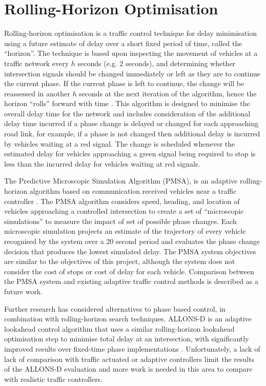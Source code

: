 \section{Rolling-Horizon Optimisation}
\label{bg:rolling-horizon}

Rolling-horizon optimisation is a traffic control technique for delay minimisation using a future estimate of delay over a short fixed period of time, called the ``horizon''. The technique is based upon inspecting the movement of vehicles at a traffic network every $h$ seconds (e.g. 2 seconds), and determining whether intersection signals should be changed immediately or left as they are to continue the current phase. If the current phase is left to continue, the change will be reassessed in another $h$ seconds at the next iteration of the algorithm, hence the horizon ``rolls'' forward with time \cite{miller1963computer}. This algorithm is designed to minimise the overall delay time for the network and includes consideration of the additional delay time incurred if a phase change is delayed or changed for each approaching road link, for example, if a phase is not changed then additional delay is incurred by vehicles waiting at a red signal. The change is scheduled whenever the estimated delay for vehicles approaching a green signal being required to stop is less than the incurred delay for vehicles waiting at red signals.

The Predictive Microscopic Simulation Algorithm (PMSA), is an adaptive rolling-horizon algorithm based on communication received vehicles near a traffic controller \cite{smith2010intellidrive}. The PMSA algorithm considers speed, heading, and location of vehicles approaching a controlled intersection to create a set of ``microscopic simulations'' to measure the impact of set of possible phase changes. Each microscopic simulation projects an estimate of the trajectory of every vehicle recognised by the system over a 20 second period and evaluates the phase change decision that produces the lowest simulated delay. The PMSA system objectives are similar to the objectives of this project, although the system does not consider the cost of stops or cost of delay for each vehicle. Comparison between the PMSA system and existing adaptive traffic control methods is described as a future work.

Further research has considered alternatives to phase based control, in combination with rolling-horizon search techniques.  ALLONS-D is an adaptive lookahead control algorithm that uses a similar rolling-horizon lookahead optimisation step to minimise total delay at an intersection, with significantly improved results over fixed-time phase implementations \cite{porche1996allonsd}. Unfortunately, a lack of  lack of comparison with traffic actuated or adaptive controllers limit the results of the ALLONS-D evaluation and more work is needed in this area to compare with realistic traffic controllers. 

